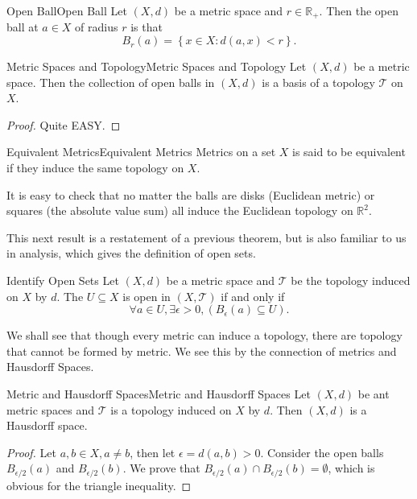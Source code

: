 \documentclass[../main.tex]{subfiles}
\begin{document}
\begin{definition}{Open Ball}{Open Ball}
Let $(X,d)$ be a metric space and $r\in \mathbb{R}_+$. Then the open ball at $a\in X$ of radius $r$ is that
\begin{equation*}
B_r(a) = \left\{ x\in X: d(a,x) <r \right\}.
\end{equation*}
\end{definition}

\begin{theorem}{Metric Spaces and Topology}{Metric Spaces and Topology}
Let $(X,d)$ be a metric space. Then the collection of open balls in $(X,d)$ is a basis of a topology $\mathcal{T}$ on $X$.
\end{theorem}
\begin{proof}
Quite EASY.
\end{proof}

\begin{definition}{Equivalent Metrics}{Equivalent Metrics}
Metrics on a set $X$ is said to be equivalent if they induce the same topology on $X$.
\end{definition}
It is easy to check that no matter the balls are disks (Euclidean metric) or squares (the absolute value sum) all induce the Euclidean topology on $\mathbb{R}^2$.

This next result is a restatement of a previous theorem, but is also familiar to us in analysis, which gives the definition of open sets.
\begin{proposition}{}{Identify Open Sets}
Let $(X,d)$ be a metric space and $\mathcal{T}$ be the topology induced on $X$ by $d$. The $U \subseteq X$ is open in $(X,\mathcal{T})$ if and only if
 \begin{equation*}
\forall a\in U,\exists \epsilon>0,(B_{\epsilon}(a) \subseteq U).
\end{equation*}
\end{proposition}

We shall see that though every metric can induce a topology, there are topology that cannot be formed by metric. We see this by the connection of metrics and Hausdorff Spaces.
\begin{theorem}{Metric and Hausdorff Spaces}{Metric and Hausdorff Spaces}
Let $(X,d)$ be ant metric spaces and $\mathcal{T}$ is a topology induced on $X$ by $d$. Then $(X,d)$ is a Hausdorff space.
\end{theorem}
\begin{proof}
Let $a,b\in X, a\neq b$, then let $\epsilon=d(a,b)>0$. Consider the open balls $B_{\epsilon /2}(a)$ and $B_{\epsilon /2}(b)$. We prove that $B_{\epsilon /2}(a)\cap B_{\epsilon /2}(b) = \emptyset $, which is obvious for the triangle inequality.
\end{proof}
\end{document}

